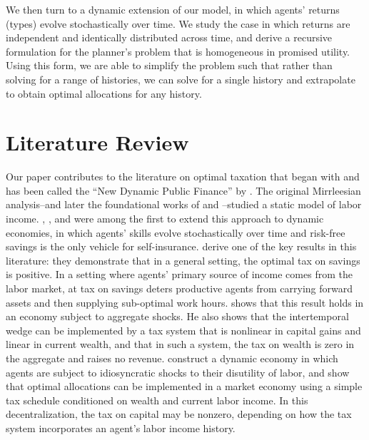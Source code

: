 \documentclass[11pt]{article}
\begin{document}
We then turn to a dynamic extension of our model, in which agents' returns (types) evolve stochastically over time. We study the case in which returns are independent and identically distributed across time, and derive a recursive formulation for the planner's problem that is homogeneous in promised utility. Using this form, we are able to simplify the problem such that rather than solving for a range of histories, we can solve for a single history and extrapolate to obtain optimal allocations for any history. 

\section{Literature Review} \label{sec:lit_rev}

Our paper contributes to the literature on optimal taxation that began with \cite{mirrlees1971exploration} and has been called the ``New Dynamic Public Finance'' by \cite{kocherlakota2010new}. The original Mirrleesian analysis--and later the foundational works of \cite{diamond1998optimal} and \cite{saez2001using}--studied a static model of labor income. \cite{golosov2003optimal}, \cite{kocherlakota2005zero}, and \cite{albanesi2006dynamic} were among the first to extend this approach to dynamic economies, in which agents' skills evolve stochastically over time and risk-free savings is the only vehicle for self-insurance. \cite{golosov2003optimal} derive one of the key results in this literature: they demonstrate that in a general setting, the optimal tax on savings is positive. In a setting where agents' primary source of income comes from the labor market, at tax on savings deters productive agents from carrying forward assets and then supplying sub-optimal work hours. \cite{kocherlakota2005zero} shows that this result holds in an economy subject to aggregate shocks. He also shows that the intertemporal wedge can be implemented by a tax system that is nonlinear in capital gains and linear in current wealth, and that in such a system, the tax on wealth is zero in the aggregate and raises no revenue. \cite{albanesi2006dynamic} construct a dynamic economy in which agents are subject to idiosyncratic shocks to their disutility of labor, and show that optimal allocations can be implemented in a market economy using a simple tax schedule conditioned on wealth and current labor income. In this decentralization, the tax on capital may be nonzero, depending on how the tax system incorporates an agent's labor income history. 
\end{document}
